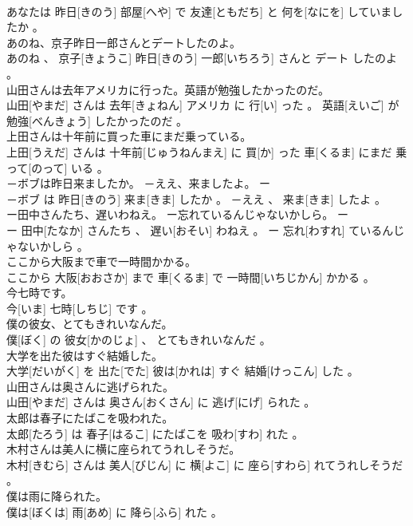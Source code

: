 \documentclass[8pt]{extreport}
\begin{document}
\begin{CJK}{UTF8}{min}
\\	あなたは 昨日[きのう] 部屋[へや] で 友達[ともだち] と 何を[なにを] していましたか 。
\\	あのね、京子昨日一郎さんとデートしたのよ。	
\\	あのね 、 京子[きょうこ] 昨日[きのう] 一郎[いちろう] さんと デート したのよ 。
\\	山田さんは去年アメリカに行った。英語が勉強したかったのだ。	
\\	山田[やまだ] さんは 去年[きょねん] アメリカ に 行[い] った 。 英語[えいご] が 勉強[べんきょう] したかったのだ 。
\\	上田さんは十年前に買った車にまだ乗っている。	
\\	上田[うえだ] さんは 十年前[じゅうねんまえ] に 買[か] った 車[くるま] にまだ 乗って[のって] いる 。
\\	－ボブは昨日来ましたか。 －ええ、来ましたよ。	ー
\\	－ボブ は 昨日[きのう] 来ま[きま] したか 。 －ええ 、 来ま[きま] したよ 。
\\	ー田中さんたち、遅いわねえ。 ー忘れているんじゃないかしら。	ー
\\	ー 田中[たなか] さんたち 、 遅い[おそい] わねえ 。 ー 忘れ[わすれ] ているんじゃないかしら 。
\\	ここから大阪まで車で一時間かかる。	
\\	ここから 大阪[おおさか] まで 車[くるま] で 一時間[いちじかん] かかる 。
\\	今七時です。	
\\	今[いま] 七時[しちじ] です 。
\\	僕の彼女、とてもきれいなんだ。	
\\	僕[ぼく] の 彼女[かのじょ] 、 とてもきれいなんだ 。
\\	大学を出た彼はすぐ結婚した。	
\\	大学[だいがく] を 出た[でた] 彼は[かれは] すぐ 結婚[けっこん] した 。
\\	山田さんは奥さんに逃げられた。	
\\	山田[やまだ] さんは 奥さん[おくさん] に 逃げ[にげ] られた 。
\\	太郎は春子にたばこを吸われた。	
\\	太郎[たろう] は 春子[はるこ] にたばこを 吸わ[すわ] れた 。
\\	木村さんは美人に横に座られてうれしそうだ。	
\\	木村[きむら] さんは 美人[びじん] に 横[よこ] に 座ら[すわら] れてうれしそうだ 。
\\	僕は雨に降られた。	
\\	僕は[ぼくは] 雨[あめ] に 降ら[ふら] れた 。

\end{CJK}
\end{document}
